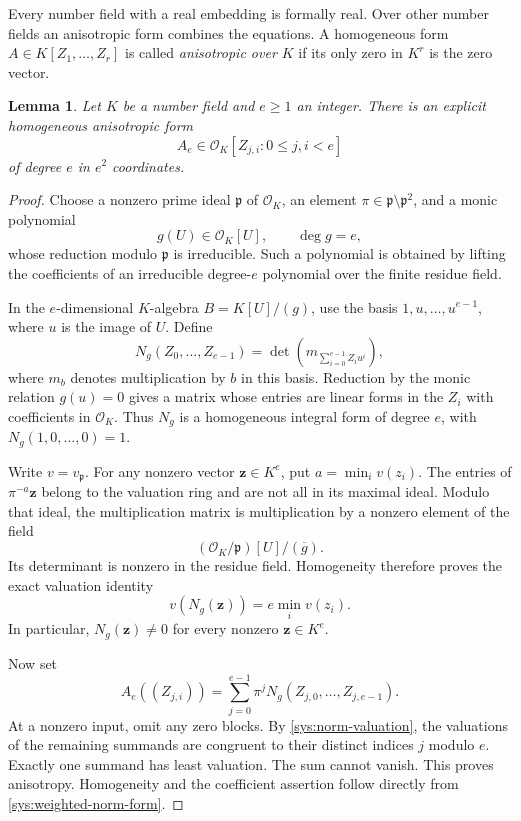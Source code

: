 \documentclass[11pt,a4paper]{article}
\newtheorem{lemma}[theorem]{Lemma}
\theoremstyle{definition}
\begin{document}
Every number field with a real embedding is formally real. Over
other number fields an anisotropic form combines the equations.
A homogeneous form $A\in K[Z_1,\ldots,Z_r]$ is
called \emph{anisotropic over $K$} if its only zero in $K^r$ is
the zero vector.

\begin{lemma}\label{sys:anisotropic-form}
Let $K$ be a number field and $e\ge1$ an integer. There is an
explicit homogeneous anisotropic form
\[
       A_e\in\mathcal O_K[Z_{j,i}:0\le j,i<e]
\]
of degree $e$ in $e^2$ coordinates.
\end{lemma}
\begin{proof}
Choose a nonzero prime ideal $\mathfrak p$ of $\mathcal O_K$,
an element $\pi\in\mathfrak p\setminus\mathfrak p^2$, and a
monic polynomial
\[
              g(U)\in\mathcal O_K[U],\qquad \deg g=e,
\]
whose reduction modulo $\mathfrak p$ is irreducible. Such a
polynomial is obtained by lifting the coefficients of an
irreducible degree-$e$ polynomial over the finite residue field.

In the $e$-dimensional $K$-algebra $B=K[U]/(g)$, use the basis
$1,u,\ldots,u^{e-1}$, where $u$ is the image of $U$. Define
\[
 N_g(Z_0,\ldots,Z_{e-1})
   =\det\left(m_{\sum_{i=0}^{e-1}Z_i u^i}\right),
\]
where $m_b$ denotes multiplication by $b$ in this basis.
Reduction by the monic relation $g(u)=0$ gives a matrix whose
entries are linear forms in the $Z_i$ with coefficients in
$\mathcal O_K$. Thus $N_g$ is a homogeneous integral form of
degree $e$, with $N_g(1,0,\ldots,0)=1$.

Write $v=v_{\mathfrak p}$. For any nonzero vector
$\mathbf z\in K^e$, put $a=\min_i v(z_i)$. The entries of
$\pi^{-a}\mathbf z$ belong to the valuation ring and are not
all in its maximal ideal. Modulo that ideal, the multiplication
matrix is multiplication by a nonzero element of the field
\[
          (\mathcal O_K/\mathfrak p)[U]/(\overline g).
\]
Its determinant is nonzero in the residue field. Homogeneity
therefore proves the exact valuation identity
\begin{equation}\label{sys:norm-valuation}
                    v(N_g(\mathbf z))=e\min_i v(z_i).
\end{equation}
In particular, $N_g(\mathbf z)\ne0$ for every nonzero
$\mathbf z\in K^e$.

Now set
\begin{equation}\label{sys:weighted-norm-form}
 A_e((Z_{j,i}))
    =\sum_{j=0}^{e-1}\pi^j N_g(Z_{j,0},\ldots,Z_{j,e-1}).
\end{equation}
At a nonzero input, omit any zero blocks. By
\eqref{sys:norm-valuation}, the valuations of the remaining
summands are congruent to their distinct indices $j$ modulo $e$.
Exactly one summand has least valuation. The sum cannot vanish.
This proves anisotropy. Homogeneity and the coefficient assertion
follow directly from \eqref{sys:weighted-norm-form}.
\end{proof}
\end{document}
